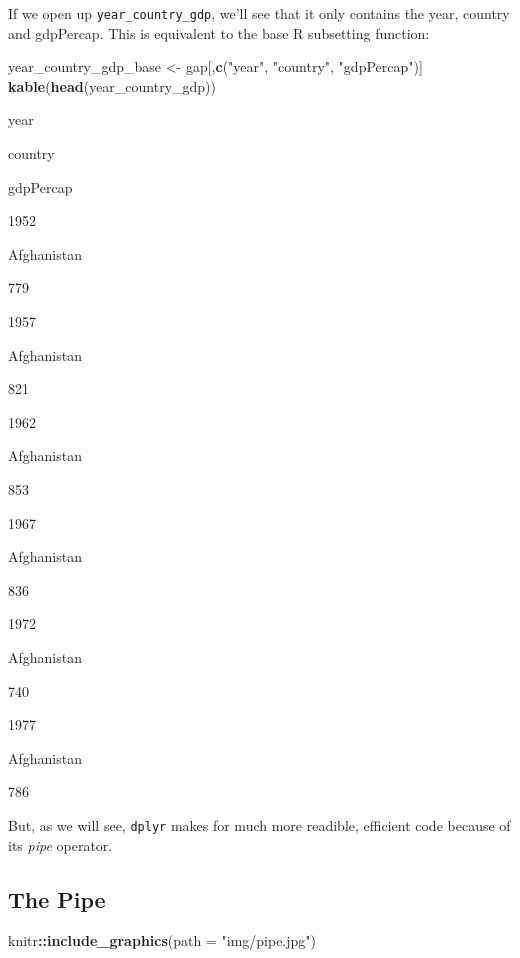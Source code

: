 \documentclass[]{book}
\newenvironment{Shaded}{\begin{snugshade}}{\end{snugshade}}
\newcommand{\KeywordTok}[1]{\textcolor[rgb]{0.13,0.29,0.53}{\textbf{#1}}}
\newcommand{\DataTypeTok}[1]{\textcolor[rgb]{0.13,0.29,0.53}{#1}}
\newcommand{\StringTok}[1]{\textcolor[rgb]{0.31,0.60,0.02}{#1}}
\newcommand{\OperatorTok}[1]{\textcolor[rgb]{0.81,0.36,0.00}{\textbf{#1}}}
\newcommand{\NormalTok}[1]{#1}
\begin{document}
If we open up \texttt{year\_country\_gdp}, we'll see that it only
contains the year, country and gdpPercap. This is equivalent to the base
R subsetting function:

\begin{Shaded}
\begin{Highlighting}[]
\NormalTok{year_country_gdp_base <-}\StringTok{ }\NormalTok{gap[,}\KeywordTok{c}\NormalTok{(}\StringTok{"year"}\NormalTok{, }\StringTok{"country"}\NormalTok{, }\StringTok{"gdpPercap"}\NormalTok{)]}
\KeywordTok{kable}\NormalTok{(}\KeywordTok{head}\NormalTok{(year_country_gdp))}
\end{Highlighting}
\end{Shaded}

year

country

gdpPercap

1952

Afghanistan

779

1957

Afghanistan

821

1962

Afghanistan

853

1967

Afghanistan

836

1972

Afghanistan

740

1977

Afghanistan

786

But, as we will see, \texttt{dplyr} makes for much more readible,
efficient code because of its \emph{pipe} operator.

\subsection{The Pipe}\label{the-pipe}

\begin{Shaded}
\begin{Highlighting}[]
\NormalTok{knitr}\OperatorTok{::}\KeywordTok{include_graphics}\NormalTok{(}\DataTypeTok{path =} \StringTok{"img/pipe.jpg"}\NormalTok{)}
\end{Highlighting}
\end{Shaded}
\end{document}
